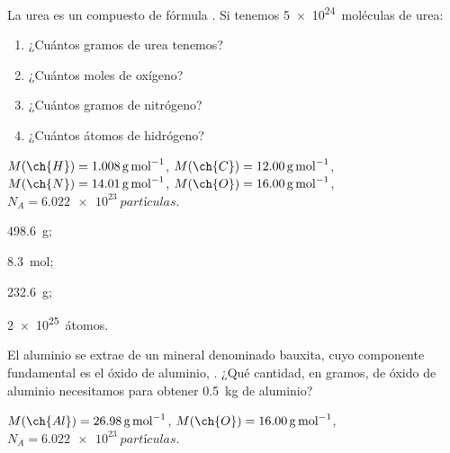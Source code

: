 \begin{exercise}[
    tags    = {termodinámica, entalpía, entalpia de reacción, calor},
    topics  = {química, termoquímica, termodinámica},
    source  = {FQ 1B SAN 2015, p43, e37},
  ]
  La urea es un compuesto de fórmula . Si tenemos \SI{5e24}{moléculas} de urea:
  \begin{enumerate}
    \item ¿Cuántos gramos de urea tenemos?
    \item ¿Cuántos moles de oxígeno?
    \item ¿Cuántos gramos de nitrógeno?
    \item ¿Cuántos átomos de hidrógeno?
  \end{enumerate}

  \begin{gexdatos}
    \( M(\ch{H}) = \SI{1.008}{\gram\per\mole} \),
    \( M(\ch{C}) = \SI{12.00}{\gram\per\mole} \),
    \( M(\ch{N}) = \SI{14.01}{\gram\per\mole} \),
    \( M(\ch{O}) = \SI{16.00}{\gram\per\mole} \),
    \( N_A = \SI{6.022e23}{partículas}\).
  \end{gexdatos}
\end{exercise}

\begin{solution}
  \begin{enumerate*}
    \item \SI{498,6}{\gram}; \item \SI{8,3}{\mole}; \item \SI{232,6}{\gram}; \item \SI{2e25}{átomos}.
  \end{enumerate*}
\end{solution}




\begin{exercise}[
    tags    = {termodinámica, entalpía, entalpia de reacción, calor},
    topics  = {química, termoquímica, termodinámica},
    source  = {FQ 1B SAN 2015, p43, e39},
  ]
  El aluminio se extrae de un mineral denominado bauxita,
  cuyo componente fundamental es el óxido de aluminio,
  . ¿Qué cantidad, en gramos, de óxido de aluminio
  necesitamos para obtener \SI{0.5}{\kilo\gram} de aluminio?

  \begin{gexdatos}
    \( M(\ch{Al}) = \SI{26.98}{\gram\per\mole} \),
    \( M(\ch{O}) = \SI{16.00}{\gram\per\mole} \),
    \( N_A = \SI{6.022e23}{partículas}\).
  \end{gexdatos}
\end{exercise}

